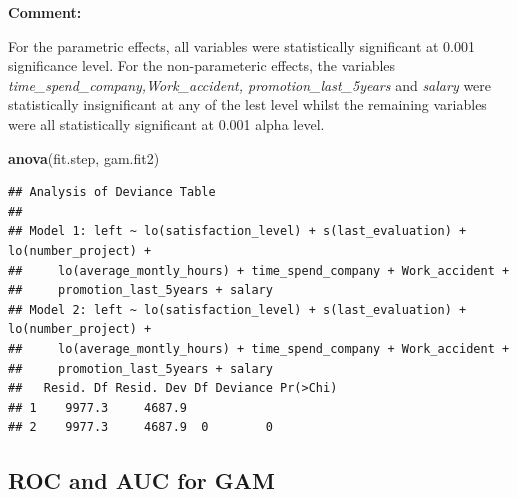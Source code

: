 \documentclass[
  11pt,
]{article}
\newenvironment{Shaded}{\begin{snugshade}}{\end{snugshade}}
\newcommand{\AttributeTok}[1]{\textcolor[rgb]{0.13,0.29,0.53}{#1}}
\newcommand{\ConstantTok}[1]{\textcolor[rgb]{0.56,0.35,0.01}{#1}}
\newcommand{\DecValTok}[1]{\textcolor[rgb]{0.00,0.00,0.81}{#1}}
\newcommand{\FloatTok}[1]{\textcolor[rgb]{0.00,0.00,0.81}{#1}}
\newcommand{\FunctionTok}[1]{\textcolor[rgb]{0.13,0.29,0.53}{\textbf{#1}}}
\newcommand{\NormalTok}[1]{#1}
\newcommand{\OtherTok}[1]{\textcolor[rgb]{0.56,0.35,0.01}{#1}}
\newcommand{\SpecialCharTok}[1]{\textcolor[rgb]{0.81,0.36,0.00}{\textbf{#1}}}
\newcommand{\StringTok}[1]{\textcolor[rgb]{0.31,0.60,0.02}{#1}}
\begin{document}
\hfill\break
\textbf{Comment:}

For the parametric effects, all variables were statistically significant
at 0.001 significance level. For the non-parameteric effects, the
variables \emph{time\_spend\_company,Work\_accident,
promotion\_last\_5years} and \emph{salary} were statistically
insignificant at any of the lest level whilst the remaining variables
were all statistically significant at 0.001 alpha level.

\begin{Shaded}
\begin{Highlighting}[]
\FunctionTok{anova}\NormalTok{(fit.step, gam.fit2)}
\end{Highlighting}
\end{Shaded}

\begin{verbatim}
## Analysis of Deviance Table
## 
## Model 1: left ~ lo(satisfaction_level) + s(last_evaluation) + lo(number_project) + 
##     lo(average_montly_hours) + time_spend_company + Work_accident + 
##     promotion_last_5years + salary
## Model 2: left ~ lo(satisfaction_level) + s(last_evaluation) + lo(number_project) + 
##     lo(average_montly_hours) + time_spend_company + Work_accident + 
##     promotion_last_5years + salary
##   Resid. Df Resid. Dev Df Deviance Pr(>Chi)
## 1    9977.3     4687.9                     
## 2    9977.3     4687.9  0        0
\end{verbatim}

\subsection{ROC and AUC for GAM}

\begin{Shaded}
\end{Shaded}
\end{document}
